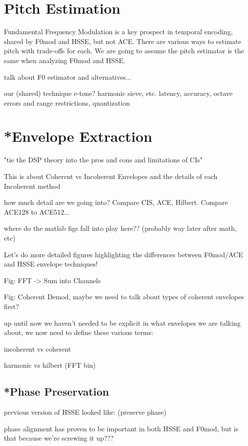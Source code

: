 \documentclass [11pt, proquest] {uwthesis}[2015/03/03]
\begin{document}
\section{Pitch Estimation}

Fundamental Frequency Modulation is a key prospect in temporal encoding, shared by F0mod and HSSE, but not ACE.  There are various ways to estimate pitch with trade-offs for each.  We are going to assume the pitch estimator is the same when analyzing F0mod and HSSE.

talk about F0 estimator and alternatives...

	our (shared) technique
	e-tone? harmonic sieve, etc.
	latency, accuracy, octave errors and range restrictions,
	quantization

\section{*Envelope Extraction}

"tie the DSP theory into the pros and cons and limitations of CIs"

This is about Coherent vs Incoherent Envelopes and the details of each Incoherent method

how much detail are we going into?  Compare CIS, ACE, Hilbert.  Compare ACE128 to ACE512...

where do the matlab figs fall into play here?? (probably way later after math, etc)

Let's do more detailed figures highlighting the differences between F0mod/ACE and HSSE envelope techniques!

Fig: FFT -> Sum into Channels

Fig: Coherent Demod, maybe we need to talk about types of coherent envelopes first?

up until now we haven't needed to be explicit in what envelopes we are talking about, we now need to define these various terms:

incoherent vs coherent

harmonic vs hilbert (FFT bin)


\subsection{*Phase Preservation}

previous version of HSSE looked like: (preserve phase)

phase alignment has proven to be important in both HSSE and F0mod, but is that because we're screwing it up???
\end{document}
